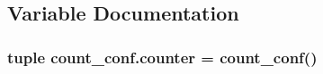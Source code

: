 \subsection{Variable Documentation}
\hypertarget{namespacecount__conf_a0642d35766e5bdb9a879cbf3975629ce}{
\subsubsection[{counter}]{\setlength{\rightskip}{0pt plus 5cm}tuple count\-\_\-conf.\-counter = {\bf count\-\_\-conf}()}}\label{namespacecount__conf_a0642d35766e5bdb9a879cbf3975629ce}
